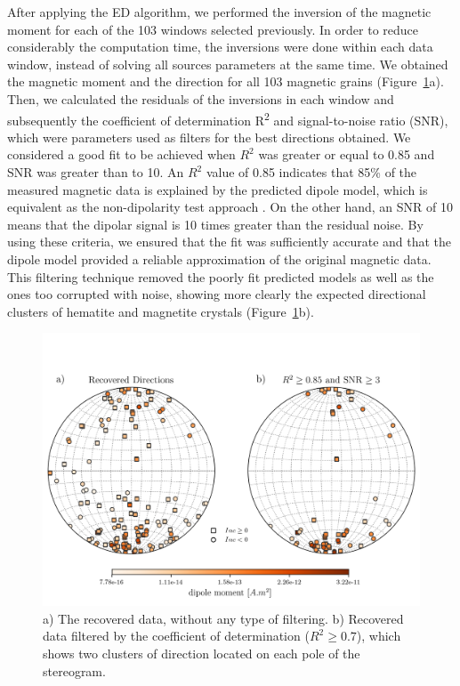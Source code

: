 After applying the ED algorithm, we performed the inversion of the magnetic moment for each of the 103 windows selected previously. In order to reduce considerably the computation time, the inversions were done within each data window, instead of solving all sources parameters at the same time. We obtained the magnetic moment and the direction for all 103 magnetic grains (Figure~\ref{real-data-stereograms}a). Then, we calculated the residuals of the inversions in each window and subsequently the coefficient of determination R\textsuperscript{2} and signal-to-noise ratio (SNR), which were parameters used as filters for the best directions obtained. We considered a good fit to be achieved when $R^2$ was greater or equal to 0.85 and SNR was greater than to 10. An $R^2$ value of 0.85 indicates that 85\% of the measured magnetic data is explained by the predicted dipole model, which is equivalent as the non-dipolarity test approach \citep{Fu2020}. On the other hand, an SNR of 10 means that the dipolar signal is 10 times greater than the residual noise. By using these criteria, we ensured that the fit was sufficiently accurate and that the dipole model provided a reliable approximation of the original magnetic data. This filtering technique removed the poorly fit predicted models as well as the ones too corrupted with noise, showing more clearly the expected directional clusters of hematite and magnetite crystals (Figure~\ref{real-data-stereograms}b).


\begin{figure}[tb]
\centering
\includegraphics[width=1\linewidth]{figures/real-data-stereograms.png}
\caption{
a) The recovered data, without any type of filtering. b) Recovered data
filtered by the coefficient of determination ($R^ 2 \geq 0.7$), which shows
two clusters of direction located on each pole of the stereogram.
}
\label{real-data-stereograms}
\end{figure}

